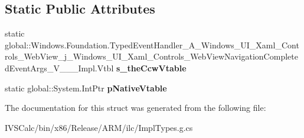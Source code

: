 \subsection*{Static Public Attributes}
\begin{DoxyCompactItemize}
\item 
\mbox{\label{struct_windows_1_1_foundation_1_1_typed_event_handler___a___windows___u_i___xaml___controls___we5456bcb78d92d2dc8a40fc7f9961d992_a425261259c846b49f13e8d31b08d5b39}} 
static global\+::\+Windows.\+Foundation.\+Typed\+Event\+Handler\+\_\+\+A\+\_\+\+Windows\+\_\+\+U\+I\+\_\+\+Xaml\+\_\+\+Controls\+\_\+\+Web\+View\+\_\+j\+\_\+\+Windows\+\_\+\+U\+I\+\_\+\+Xaml\+\_\+\+Controls\+\_\+\+Web\+View\+Navigation\+Completed\+Event\+Args\+\_\+\+V\+\_\+\+\_\+\+\_\+\+Impl.\+Vtbl {\bfseries s\+\_\+the\+Ccw\+Vtable}
\item 
\mbox{\label{struct_windows_1_1_foundation_1_1_typed_event_handler___a___windows___u_i___xaml___controls___we5456bcb78d92d2dc8a40fc7f9961d992_a39da8a0b86799d50739d89c51168cfec}} 
static global\+::\+System.\+Int\+Ptr {\bfseries p\+Native\+Vtable}
\end{DoxyCompactItemize}


The documentation for this struct was generated from the following file\+:\begin{DoxyCompactItemize}
\item 
I\+V\+S\+Calc/bin/x86/\+Release/\+A\+R\+M/ilc/Impl\+Types.\+g.\+cs\end{DoxyCompactItemize}
